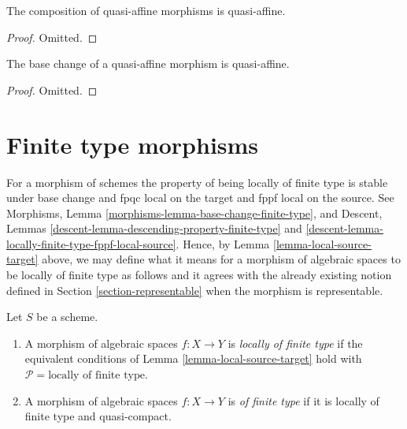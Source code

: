 \begin{lemma}
\label{lemma-composition-quasi-affine}
The composition of quasi-affine morphisms is quasi-affine.
\end{lemma}

\begin{proof}
Omitted.
\end{proof}

\begin{lemma}
\label{lemma-base-change-quasi-affine}
The base change of a quasi-affine morphism is quasi-affine.
\end{lemma}

\begin{proof}
Omitted.
\end{proof}







\section{Finite type morphisms}
\label{section-finite-type}

\noindent
For a morphism of schemes the property of being locally of finite type is
stable under base change and fpqc local on
the target and fppf local on the source. See
Morphisms, Lemma \ref{morphisms-lemma-base-change-finite-type}, and
Descent, Lemmas \ref{descent-lemma-descending-property-finite-type} and
\ref{descent-lemma-locally-finite-type-fppf-local-source}.
Hence, by
Lemma \ref{lemma-local-source-target}
above, we may define what it means for a morphism of algebraic spaces
to be locally of finite type as
follows and it agrees with the already existing notion defined in
Section \ref{section-representable}
when the morphism is representable.

\begin{definition}
\label{definition-locally-finite-type}
Let $S$ be a scheme.
\begin{enumerate}
\item A morphism of algebraic spaces $f : X \to Y$ is
{\it locally of finite type} if the equivalent conditions of
Lemma \ref{lemma-local-source-target} hold with
$\mathcal{P} = \text{locally of finite type}$.
\item A morphism of  algebraic spaces $f : X \to Y$ is
{\it of finite type} if it is locally of finite type and quasi-compact.
\end{enumerate}
\end{definition}

